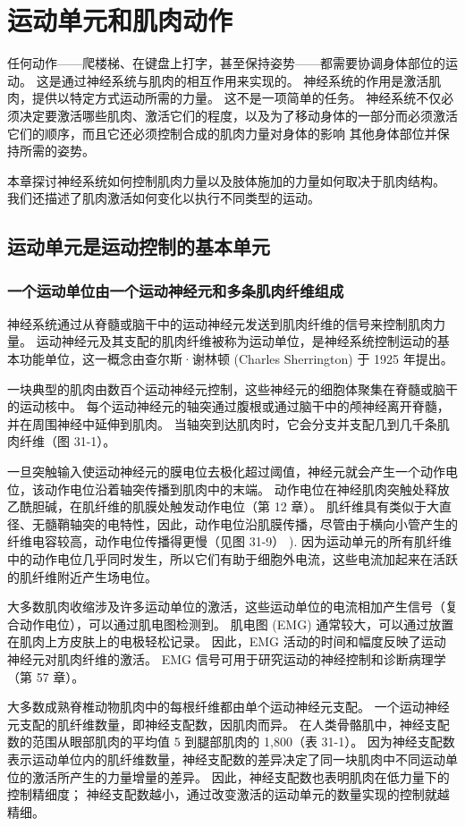 \chapter{运动单元和肌肉动作}

任何动作——爬楼梯、在键盘上打字，甚至保持姿势——都需要协调身体部位的运动。 这是通过神经系统与肌肉的相互作用来实现的。 神经系统的作用是激活肌肉，提供以特定方式运动所需的力量。 这不是一项简单的任务。 神经系统不仅必须决定要激活哪些肌肉、激活它们的程度，以及为了移动身体的一部分而必须激活它们的顺序，而且它还必须控制合成的肌肉力量对身体的影响 其他身体部位并保持所需的姿势。

本章探讨神经系统如何控制肌肉力量以及肢体施加的力量如何取决于肌肉结构。 我们还描述了肌肉激活如何变化以执行不同类型的运动。

\section{运动单元是运动控制的基本单元}
\subsection{一个运动单位由一个运动神经元和多条肌肉纤维组成}
神经系统通过从脊髓或脑干中的运动神经元发送到肌肉纤维的信号来控制肌肉力量。 运动神经元及其支配的肌肉纤维被称为运动单位，是神经系统控制运动的基本功能单位，这一概念由查尔斯·谢林顿 (Charles Sherrington) 于 1925 年提出。

一块典型的肌肉由数百个运动神经元控制，这些神经元的细胞体聚集在脊髓或脑干的运动核中。 每个运动神经元的轴突通过腹根或通过脑干中的颅神经离开脊髓，并在周围神经中延伸到肌肉。 当轴突到达肌肉时，它会分支并支配几到几千条肌肉纤维（图 31-1）。

一旦突触输入使运动神经元的膜电位去极化超过阈值，神经元就会产生一个动作电位，该动作电位沿着轴突传播到肌肉中的末端。 动作电位在神经肌肉突触处释放乙酰胆碱，在肌纤维的肌膜处触发动作电位（第 12 章）。 肌纤维具有类似于大直径、无髓鞘轴突的电特性，因此，动作电位沿肌膜传播，尽管由于横向小管产生的纤维电容较高，动作电位传播得更慢（见图 31-9） ). 因为运动单元的所有肌纤维中的动作电位几乎同时发生，所以它们有助于细胞外电流，这些电流加起来在活跃的肌纤维附近产生场电位。

大多数肌肉收缩涉及许多运动单位的激活，这些运动单位的电流相加产生信号（复合动作电位），可以通过肌电图检测到。 肌电图 (EMG) 通常较大，可以通过放置在肌肉上方皮肤上的电极轻松记录。 因此，EMG 活动的时间和幅度反映了运动神经元对肌肉纤维的激活。 EMG 信号可用于研究运动的神经控制和诊断病理学（第 57 章）。

大多数成熟脊椎动物肌肉中的每根纤维都由单个运动神经元支配。 一个运动神经元支配的肌纤维数量，即神经支配数，因肌肉而异。 在人类骨骼肌中，神经支配数的范围从眼部肌肉的平均值 5 到腿部肌肉的 1,800（表 31-1）。 因为神经支配数表示运动单位内的肌纤维数量，神经支配数的差异决定了同一块肌肉中不同运动单位的激活所产生的力量增量的差异。 因此，神经支配数也表明肌肉在低力量下的控制精细度； 神经支配数越小，通过改变激活的运动单元的数量实现的控制就越精细。

